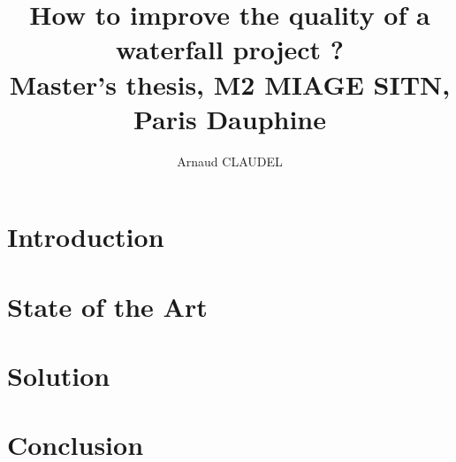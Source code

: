 \documentclass[12pt]{report}
\title{
How to improve the quality of a waterfall project ?
\\ {\large Master's thesis, M2 MIAGE SITN, Paris Dauphine}}
\author{Arnaud CLAUDEL}
\begin{document}
    \maketitle
    \tableofcontents

    \chapter{Introduction}\label{ch:introduction}
    

    \chapter{State of the Art}\label{ch:state-of-the-art}
    

    \chapter{Solution}\label{ch:solution}
    

    \chapter{Conclusion}\label{ch:conclusion}
    

    \nocite{*}
    
    
\end{document}

